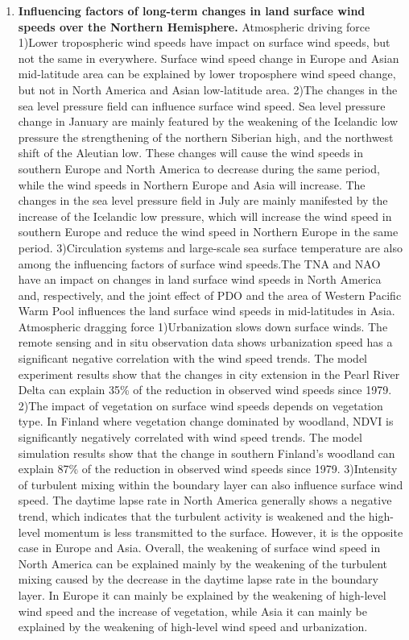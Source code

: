 \begin{enumerate}
\item  \textbf{Influencing factors of long-term changes in land surface wind speeds over the Northern Hemisphere.} Atmospheric driving force 1)Lower tropospheric wind speeds have impact on surface wind speeds, but not the same in everywhere. Surface wind speed change in Europe and Asian mid-latitude area can be explained by lower troposphere wind speed change, but not in North America and Asian low-latitude area. 2)The changes in the sea level pressure field can influence surface wind speed. Sea level pressure change in January are mainly featured by the weakening of the Icelandic low pressure the strengthening of the northern Siberian high, and the northwest shift of the Aleutian low. These changes will cause the wind speeds in southern Europe and North America to decrease during the same period, while the wind speeds in Northern Europe and Asia will increase. The changes in the sea level pressure field in July are mainly manifested by the increase of the Icelandic low pressure, which will increase the wind speed in southern Europe and reduce the wind speed in Northern Europe in the same period.  3)Circulation systems and large-scale sea surface temperature are also among the influencing factors of surface wind speeds.The TNA and NAO have an impact on changes in land surface wind speeds in North America and, respectively, and the joint effect of PDO and the area of Western Pacific Warm Pool influences the land surface wind speeds in mid-latitudes in Asia. Atmospheric dragging force 1)Urbanization slows down surface winds. The remote sensing and in situ observation data shows urbanization speed has a significant negative correlation with the wind speed trends. The model experiment results show that the changes in city extension in the Pearl River Delta can explain 35\% of the reduction in observed wind speeds since 1979. 2)The impact of vegetation on surface wind speeds depends on vegetation type. In Finland where vegetation change dominated by woodland, NDVI is significantly negatively correlated with wind speed trends. The model simulation results show that the change in southern Finland's woodland can explain 87\% of the reduction in observed wind speeds since 1979. 3)Intensity of turbulent mixing within the boundary layer can also influence surface wind speed. The daytime lapse rate in North America generally shows a negative trend, which indicates that the turbulent activity is weakened and the high-level momentum is less transmitted to the surface. However, it is the opposite case in Europe and Asia. Overall, the weakening of surface wind speed in North America can be explained mainly by the weakening of the turbulent mixing caused by the decrease in the daytime lapse rate in the boundary layer. In Europe it can mainly be explained by the weakening of high-level wind speed and the increase of vegetation, while Asia it can mainly be explained by the weakening of high-level wind speed and urbanization.


\end{enumerate}
